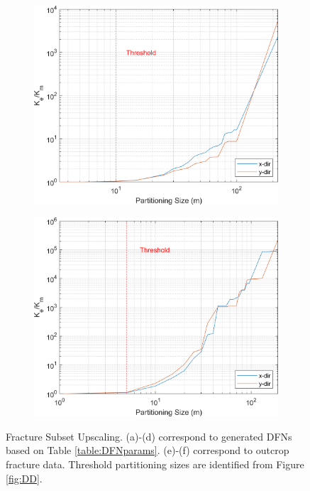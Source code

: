 \documentclass[main.tex]{subfiles}
\begin{document}
\begin{figure}[ht]
\begin{subfigure}{0.3\textwidth}
        \includegraphics[width=\textwidth]{FSU/Apodi2_FSU_nohead.png}
        \label{fig:FSU_A2}
    \end{subfigure}
    \begin{subfigure}{0.3\textwidth}
        \includegraphics[width=\textwidth]{FSU/Apodi4_FSU_nohead.png}
        \label{fig:FSU_A4}
    \end{subfigure}
    \caption{Fracture Subset Upscaling. (a)-(d) correspond to generated DFNs based on Table \ref{table:DFNparams}. (e)-(f) correspond to outcrop fracture data. Threshold partitioning sizes are identified from Figure \ref{fig:DD}.}
    \label{fig:FSU}
\end{figure}
\end{document}
